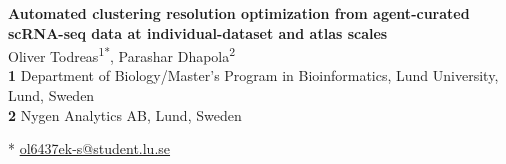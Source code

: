 \documentclass[10pt,letterpaper]{article}
\begin{document}
\vspace*{0.2in}

\begin{flushleft}
{\Large
\textbf{Automated clustering resolution optimization from agent-curated scRNA-seq data at individual-dataset and atlas scales} %
}
\newline
\\
Oliver Todreas\textsuperscript{1*},
Parashar Dhapola\textsuperscript{2}
\\
\bigskip
\textbf{1} Department of Biology/Master's Program in Bioinformatics, Lund University, Lund, Sweden
\\
\textbf{2} Nygen Analytics AB, Lund, Sweden
\\
\bigskip


* \href{mailto:ol6437ek-s@student.lu.se}{ol6437ek-s@student.lu.se}

\end{flushleft}


%
\end{document}
